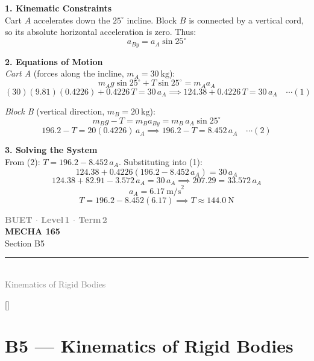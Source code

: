 \documentclass[12pt,a3paper]{article}
\newcommand{\secdivider}[4]{%
  \newpage\thispagestyle{empty}%
  \vspace*{\fill}%
  \begin{tcolorbox}[enhanced,colback=#4!7,colframe=#3,boxrule=1.5pt,arc=8pt,
    left=20pt,right=20pt,top=22pt,bottom=22pt,
    shadow={3pt}{-3pt}{0pt}{black!15}]
    \centering
    {\large\textcolor{gray}{\textbf{BUET $\cdot$ Level\,1 $\cdot$ Term\,2}}}\\[8pt]
    {\fontsize{26}{32}\selectfont\bfseries\textcolor{#3}{MECHA 165}}\\[6pt]
    {\fontsize{15}{19}\selectfont\textcolor{dgray}{#1}}\\[12pt]
    \textcolor{#3!60}{\rule{0.5\textwidth}{0.5pt}}\\[6pt]
    {\small\textcolor{gray}{#2}}
  \end{tcolorbox}%
  \vspace*{\fill}\newpage%
}
\begin{document}
\begin{enumerate}
\begin{tcolorbox}[enhanced,breakable,ansbox,colback=cG!4,colframe=cG,
  boxrule=0.8pt,arc=5pt,
  title={\textbf{Solution}},fonttitle=\bfseries\color{white},
  colbacktitle=cG]

\textbf{1. Kinematic Constraints}\\[4pt]

Cart $A$ accelerates down the $25^\circ$ incline. Block $B$ is connected by a vertical cord, so its absolute horizontal acceleration is zero. Thus:
\[
  a_{By} = a_A \sin25^\circ
\]

\medskip
\textbf{2. Equations of Motion}\\[4pt]

\textit{Cart A} (forces along the incline, $m_A = 30\ \text{kg}$):
\[
  m_A g\sin25^\circ + T\sin25^\circ = m_A a_A
\]
\[
  (30)(9.81)(0.4226) + 0.4226\,T = 30\,a_A
  \implies 124.38 + 0.4226\,T = 30\,a_A \quad\cdots(1)
\]

\textit{Block B} (vertical direction, $m_B = 20\ \text{kg}$):
\[
  m_B g - T = m_B a_{By} = m_B\, a_A\sin25^\circ
\]
\[
  196.2 - T = 20(0.4226)\,a_A
  \implies 196.2 - T = 8.452\,a_A \quad\cdots(2)
\]

\medskip
\textbf{3. Solving the System}\\[4pt]

From (2): $T = 196.2 - 8.452\,a_A$. Substituting into (1):
\[
  124.38 + 0.4226(196.2 - 8.452\,a_A) = 30\,a_A
\]
\[
  124.38 + 82.91 - 3.572\,a_A = 30\,a_A
  \implies 207.29 = 33.572\,a_A
\]
\[
  \boxed{a_A = 6.17\ \text{m/s}^2}
\]
\[
  T = 196.2 - 8.452(6.17) \implies \boxed{T \approx 144.0\ \text{N}}
\]

\end{tcolorbox}


\end{enumerate}

\secdivider{Section B5}{Kinematics of Rigid Bodies}{cH}{cH}
\label{sec:B5}
\titleformat{\section}{\large\bfseries\color{cH}}{}{0em}{}[\titlerule]
\section{B5 --- Kinematics of Rigid Bodies}
\end{document}

